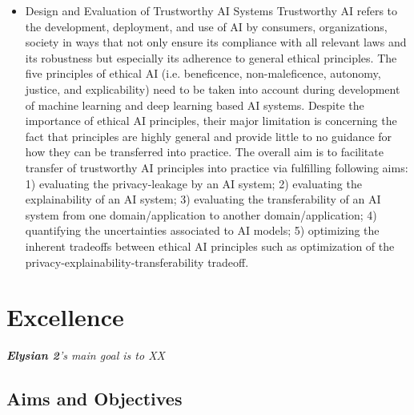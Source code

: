 \documentclass[a4paper,11pt]{article}
\newcommand{\project}[1]{\textbf{#1}\xspace}
\newcommand{\SECURITY}{\project{Elysian 2}}
\newcommand{\TheProject}{\SECURITY}
\begin{document}
\begin{itemize}
\item Design and Evaluation of Trustworthy AI Systems
Trustworthy AI refers to the development, deployment, and use of AI by consumers, organizations, society in ways that not only ensure its compliance with all relevant laws and its robustness but especially its adherence to general ethical principles. The five principles of ethical AI (i.e. beneficence, non-maleficence, autonomy, justice, and explicability) need to be taken into account during development of machine learning and deep learning based AI systems. Despite the importance of ethical AI principles, their major limitation is concerning the fact that principles are highly general and provide little to no guidance for how they can be transferred into practice. The overall aim is to facilitate transfer of trustworthy AI principles into practice via fulfilling following aims: 
1) evaluating the privacy-leakage by an AI system; 
2) evaluating the explainability of an AI system; 
3) evaluating the transferability of an AI system from one domain/application to another domain/application; 
4) quantifying the uncertainties associated to AI models; 
5) optimizing the inherent tradeoffs between ethical AI principles such as optimization of the privacy-explainability-transferability tradeoff.
\end{itemize}




\section{Excellence}






\begin{mdframed}[backgroundcolor=blue!5]
\emph{\TheProject's main goal is to XX}
\end{mdframed}





\subsection{Aims and Objectives}
\label{sect:objectives}
\end{document}
